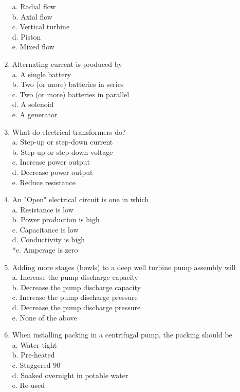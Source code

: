 \begin{enumerate}[1.]
a. Radial flow\\
b. Axial flow\\
c. Vertical turbine\\
d. Piston\\
e. Mixed flow\\
\item Alternating current is produced by\\
a. A single battery\\
b. Two (or more) batteries in series\\
c. Two (or more) batteries in parallel\\
d. A solenoid\\
e. A generator\\
\item What do electrical transformers do?\\
a. Step-up or step-down current\\
b. Step-up or step-down voltage\\
c. Increase power output\\
d. Decrease power output\\
e. Reduce resistance 
\item An "Open" electrical circuit is one in which\\
a. Resistance is low\\
b. Power production is high\\
c. Capacitance is low\\
d. Conductivity is high\\
*e. Amperage is zero\\
\item Adding more stages (bowls) to a deep well turbine pump assembly will\\
a. Increase the pump discharge capacity\\
b. Decrease the pump discharge capacity\\
c. Increase the pump discharge pressure\\
d. Decrease the pump discharge pressure\\
e. None of the above\\
\item When installing packing in a centrifugal pump, the packing should be\\
a. Water tight\\
b. Pre-heated\\
c. Staggered $90^{\circ}$\\
d. Soaked overnight in potable water\\
e. Re-used\\

\end{enumerate}
